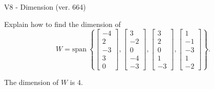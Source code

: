 \begin{exercise}
  \begin{exerciseTitle}V8 - Dimension (ver. 664)\end{exerciseTitle}
  \begin{exerciseStatement}
    Explain how to find the dimension of 
\[W=\mathrm{span}\ \left\{\left[\begin{array}{r}
-4 \\
2 \\
-3 \\
3 \\
0
\end{array}\right] , \left[\begin{array}{r}
3 \\
-2 \\
0 \\
-4 \\
-3
\end{array}\right] , \left[\begin{array}{r}
3 \\
2 \\
0 \\
1 \\
-3
\end{array}\right] , \left[\begin{array}{r}
1 \\
-1 \\
-3 \\
1 \\
-2
\end{array}\right]\right\}.\]



  \end{exerciseStatement}
  \begin{exerciseAnswer}
   The dimension of \(W\) is  \(4\).
  


  \end{exerciseAnswer}
\end{exercise}